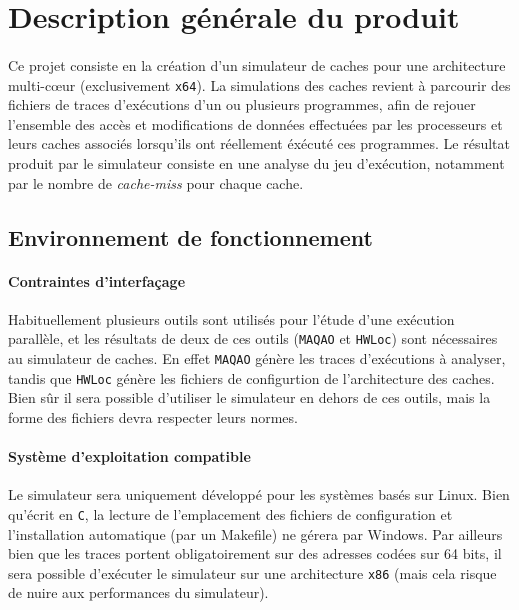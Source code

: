 \section{Description générale du produit}

\paragraph{}
Ce projet consiste en la création d'un simulateur de caches pour une architecture multi-c\oe ur (exclusivement \verb!x64!). La simulations des caches revient à parcourir des fichiers de traces d'exécutions d'un ou plusieurs programmes, afin de rejouer l'ensemble des accès et modifications de données effectuées par les processeurs et leurs caches associés lorsqu'ils ont réellement éxécuté ces programmes. Le résultat produit par le simulateur consiste en une analyse du jeu d'exécution, notamment par le nombre de \emph{cache-miss} pour chaque cache.

\subsection{Environnement de fonctionnement}

\paragraph{Contraintes d'interfaçage}
Habituellement plusieurs outils sont utilisés pour l'étude d'une exécution parallèle, et les résultats de deux de ces outils (\texttt{MAQAO} et \texttt{HWLoc}) sont nécessaires au simulateur de caches. En effet \texttt{MAQAO} génère les traces d'exécutions à analyser, tandis que \texttt{HWLoc}
génère les fichiers de configurtion de l'architecture des caches. Bien sûr il sera possible d'utiliser le simulateur en dehors de ces outils, mais la forme des fichiers devra respecter leurs normes. 

\paragraph{Système d'exploitation compatible}
Le simulateur sera uniquement développé pour les systèmes basés sur Linux. Bien qu'écrit en \texttt{C}, la lecture de l'emplacement des fichiers de configuration et l'installation automatique (par un Makefile) ne gérera par Windows. Par ailleurs bien que les traces portent obligatoirement sur des adresses codées sur 64 bits, il sera possible d'exécuter le simulateur sur une architecture \verb!x86! (mais cela risque de nuire aux performances du simulateur).

